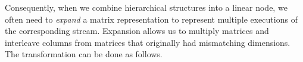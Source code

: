 
Consequently, when we combine hierarchical structures into a linear
node, we often need to {\it expand} a matrix representation to
represent multiple executions of the corresponding stream.  Expansion
allows us to multiply matrices and interleave columns from matrices
that originally had mismatching dimensions.  The transformation can be
done as follows.


